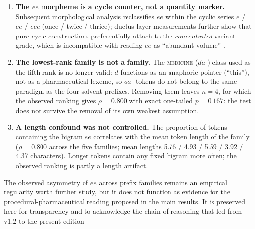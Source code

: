 \documentclass[11pt,a4paper]{article}
\begin{document}
\begin{enumerate}[leftmargin=*,itemsep=3pt]
\item \textbf{The $ee$ morpheme is a cycle counter, not a quantity marker.} Subsequent morphological analysis reclassifies $ee$ within the cyclic series $e$ / $ee$ / $eee$ (once / twice / thrice); ductus-layer measurements further show that pure cycle constructions preferentially attach to the \textit{concentrated} variant grade, which is incompatible with reading $ee$ as ``abundant volume'' \citep{Placa2026b, Placa2026c}.
\item \textbf{The lowest-rank family is not a family.} The \textsc{medicine} ($da$-) class used as the fifth rank is no longer valid: $d$ functions as an anaphoric pointer (``this''), not as a pharmaceutical lexeme, so $da$- tokens do not belong to the same paradigm as the four solvent prefixes. Removing them leaves $n=4$, for which the observed ranking gives $\rho = 0.800$ with exact one-tailed $p = 0.167$: the test does not survive the removal of its own weakest assumption.
\item \textbf{A length confound was not controlled.} The proportion of tokens containing the bigram $ee$ correlates with the mean token length of the family ($\rho = 0.800$ across the five families; mean lengths 5.76 / 4.93 / 5.59 / 3.92 / 4.37 characters). Longer tokens contain any fixed bigram more often; the observed ranking is partly a length artifact.
\end{enumerate}

The observed asymmetry of $ee$ across prefix families remains an empirical regularity worth further study, but it does not function as evidence for the procedural-pharmaceutical reading proposed in the main results. It is preserved here for transparency and to acknowledge the chain of reasoning that led from v1.2 to the present edition.
\end{document}
